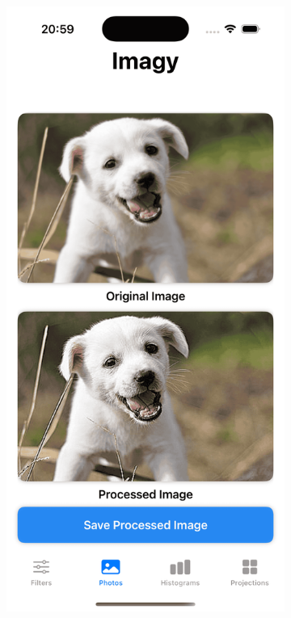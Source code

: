 \documentclass[a4paper]{article}
\begin{document}
\begin{figure}[H]
    \centering
    \begin{subfigure}{0.2\textwidth}
        \centering
        \includegraphics[width=\linewidth]{images/dog_sharpening.png}

\end{subfigure}
\end{figure}
\end{document}
